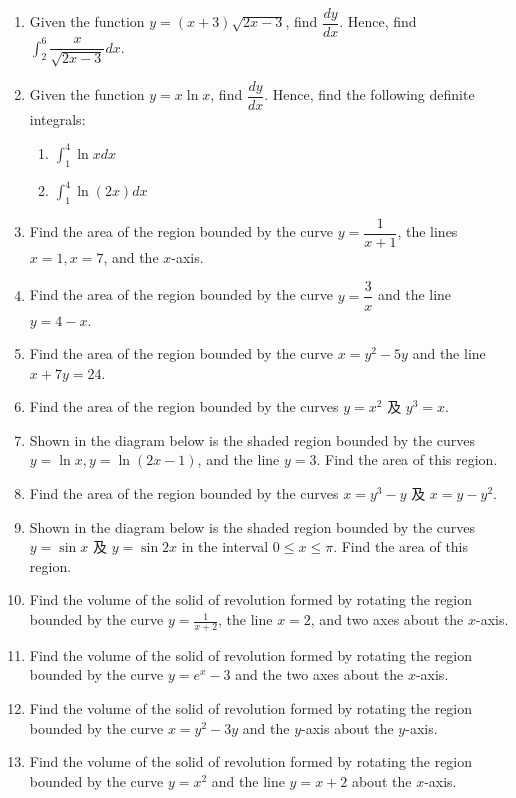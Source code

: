 \documentclass{report}
\begin{document}
\begin{enumerate}
    \item Given the function $y=(x+3) \sqrt{2 x-3}$, find $\dfrac{d y}{d x}$. Hence, find
          $\int_2^6 \dfrac{x}{\sqrt{2 x-3}} d x$.
    \item Given the function $y=x \ln x$, find $\dfrac{d y}{d x}$. Hence, find the
          following definite integrals:
          \begin{enumerate}
              \item $\displaystyle\int_1^4 \ln x d x$
              \item $\displaystyle\int_1^4 \ln (2 x) d x$
          \end{enumerate}
    \item Find the area of the region bounded by the curve $y=\dfrac{1}{x+1}$, the lines
          $x=1, x=7$, and the $x$-axis.
    \item Find the area of the region bounded by the curve $y=\dfrac{3}{x}$ and the line
          $y=4-x$.
    \item Find the area of the region bounded by the curve $x=y^2-5 y$ and the line $x+7
              y=24$.
    \item Find the area of the region bounded by the curves $y=x^2$ 及 $y^3=x$.
    \item Shown in the diagram below is the shaded region bounded by the curves $y=\ln x,
              y=\ln (2 x-1)$, and the line $y=3$. Find the area of this region.
    \item Find the area of the region bounded by the curves $x=y^3-y$ 及 $x=y-y^2$.
    \item Shown in the diagram below is the shaded region bounded by the curves $y=\sin
              x$ 及 $y=\sin 2 x$ in the interval $0 \leq x \leq \pi$. Find the area of this
          region.
    \item Find the volume of the solid of revolution formed by rotating the region
          bounded by the curve $y=\frac{1}{x+2}$, the line $x=2$, and two axes about the
          $x$-axis.
    \item Find the volume of the solid of revolution formed by rotating the region
          bounded by the curve $y=e^x-3$ and the two axes about the $x$-axis.
    \item Find the volume of the solid of revolution formed by rotating the region
          bounded by the curve $x=y^2-3 y$ and the $y$-axis about the $y$-axis.
    \item Find the volume of the solid of revolution formed by rotating the region
          bounded by the curve $y=x^2$ and the line $y=x+2$ about the $x$-axis.

\end{enumerate}
\end{document}
